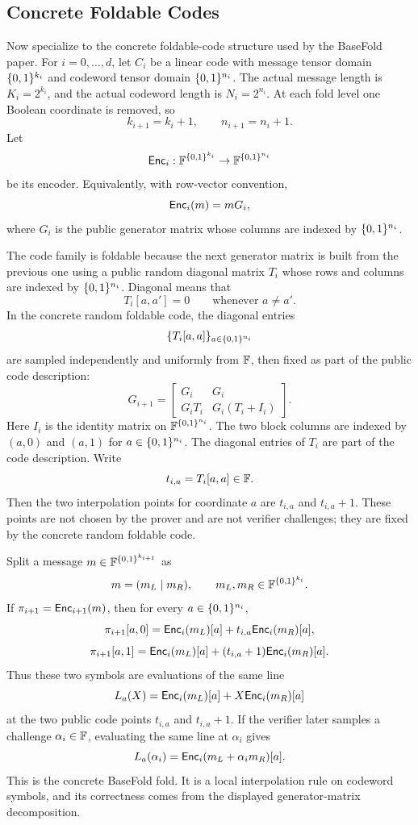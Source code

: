 \subsection{Concrete Foldable Codes}

Now specialize to the concrete foldable-code structure used by the BaseFold
paper.  For $i=0,\ldots,d$, let $C_i$ be a linear code with message tensor
domain $\{0,1\}^{k_i}$ and codeword tensor domain $\{0,1\}^{n_i}$.  The actual message
length is $K_i=2^{k_i}$, and the actual codeword length is $N_i=2^{n_i}$.
At each fold level one Boolean coordinate is removed, so
\[
  k_{i+1}=k_i+1,
  \qquad
  n_{i+1}=n_i+1.
\]
Let
\[
  \mathsf{Enc}_i:\mathbb{F}^{\{0,1\}^{k_i}}\to\mathbb{F}^{\{0,1\}^{n_i}}
\]
be its encoder.  Equivalently, with row-vector convention,
\[
  \mathsf{Enc}_i(m)=mG_i,
\]
where $G_i$ is the public generator matrix whose columns are indexed by
$\{0,1\}^{n_i}$.

The code family is foldable because the next generator matrix is built from the
previous one using a public random diagonal matrix $T_i$ whose rows and columns
are indexed by $\{0,1\}^{n_i}$.  Diagonal means that
\[
  T_i[a,a']=0
  \qquad\text{whenever } a\ne a'.
\]
In the concrete random foldable code, the diagonal entries
\[
  \{T_i[a,a]\}_{a\in\{0,1\}^{n_i}}
\]
are sampled independently and uniformly from $\mathbb{F}$, then fixed as part of the
public code description:
\[
  G_{i+1}
  =
  \begin{bmatrix}
    G_i & G_i \\
    G_iT_i & G_i(T_i+I_i)
  \end{bmatrix}.
\]
Here $I_i$ is the identity matrix on $\mathbb{F}^{\{0,1\}^{n_i}}$.
The two block columns are indexed by $(a,0)$ and $(a,1)$ for
$a\in\{0,1\}^{n_i}$.  The diagonal entries of $T_i$ are part of the code
description.  Write
\[
  t_{i,a}=T_i[a,a]\in\mathbb{F}.
\]
Then the two interpolation points for coordinate $a$ are $t_{i,a}$ and
$t_{i,a}+1$.  These points are not chosen by the prover and are not verifier
challenges; they are fixed by the concrete random foldable code.

Split a message $m\in\mathbb{F}^{\{0,1\}^{k_{i+1}}}$ as
\[
  m=(m_L\mid m_R),
  \qquad m_L,m_R\in\mathbb{F}^{\{0,1\}^{k_i}}.
\]
If $\pi_{i+1}=\mathsf{Enc}_{i+1}(m)$, then for every $a\in\{0,1\}^{n_i}$,
\[
  \pi_{i+1}[a,0]
  =
  \mathsf{Enc}_i(m_L)[a]+t_{i,a}\mathsf{Enc}_i(m_R)[a],
\]
\[
  \pi_{i+1}[a,1]
  =
  \mathsf{Enc}_i(m_L)[a]+(t_{i,a}+1)\mathsf{Enc}_i(m_R)[a].
\]
Thus these two symbols are evaluations of the same line
\[
  L_a(X)=\mathsf{Enc}_i(m_L)[a]+X\mathsf{Enc}_i(m_R)[a]
\]
at the two public code points $t_{i,a}$ and $t_{i,a}+1$.  If the verifier
later samples a challenge $\alpha_i\in\mathbb{F}$, evaluating the same line at
$\alpha_i$ gives
\[
  L_a(\alpha_i)
  =
  \mathsf{Enc}_i(m_L+\alpha_i m_R)[a].
\]
This is the concrete BaseFold fold.  It is a local interpolation rule on
codeword symbols, and its correctness comes from the displayed generator-matrix
decomposition.

